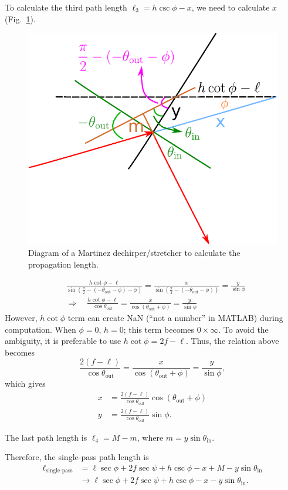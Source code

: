 \documentclass[12pt,hidelinks]{book}
\begin{document}
To calculate the third path length $\ell_3=h\csc\phi-x$, we need to calculate $x$ (Fig.~\ref{fig:martinez_stretcher_close_view}).
\begin{figure}[htbp]
\centering
\includegraphics[width=.4\textwidth]{Martinez stretcher (close view).pdf}
\caption{Diagram of a Martinez dechirper/stretcher to calculate the propagation length.}
\label{fig:martinez_stretcher_close_view}
\end{figure}
\begin{align}
& \frac{h\cot\phi-\ell}{\sin\left(\frac{\pi}{2}-\left(-\theta_{\text{out}}-\phi\right)-\phi\right)}=\frac{x}{\sin\left(\frac{\pi}{2}-\left(-\theta_{\text{out}}-\phi\right)\right)}=\frac{y}{\sin\phi} \nonumber \\
& \Rightarrow\quad\frac{h\cot\phi-\ell}{\cos\theta_{\text{out}}}=\frac{x}{\cos\left(\theta_{\text{out}}+\phi\right)}=\frac{y}{\sin\phi} \label{eq:martinez_xy}
\end{align}
However, $h\cot\phi$ term can create NaN (``not a number'' in MATLAB) during computation. When $\phi=0$, $h=0$; this term becomes $0\times\infty$. To avoid the ambiguity, it is preferable to use $h\cot\phi=2f-\ell$. Thus, the relation above becomes
\begin{equation}
\frac{2(f-\ell)}{\cos\theta_{\text{out}}}=\frac{x}{\cos\left(\theta_{\text{out}}+\phi\right)}=\frac{y}{\sin\phi},
\end{equation}
which gives
\begin{subequations}
\begin{align}
x & =\frac{2(f-\ell)}{\cos\theta_{\text{out}}}\cos\left(\theta_{\text{out}}+\phi\right) \\
y & =\frac{2(f-\ell)}{\cos\theta_{\text{out}}}\sin\phi.
\end{align}
\end{subequations}

The last path length is $\ell_4=M-m$, where $m=y\sin\theta_{\text{in}}$.

Therefore, the single-pass path length is 
\begin{align}
\ell_{\text{single-pass}} & =\ell\sec\phi+2f\sec\psi+h\csc\phi-x+M-y\sin\theta_{\text{in}} \nonumber \\
& \rightarrow \ell\sec\phi+2f\sec\psi+h\csc\phi-x-y\sin\theta_{\text{in}}.
\end{align}
\end{document}
